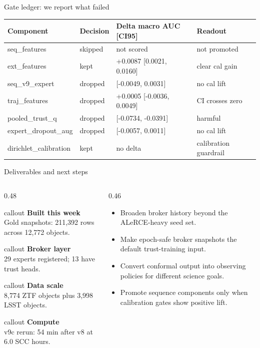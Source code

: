 \documentclass[aspectratio=169]{beamer}
\newcommand{\calloutbox}[2]{%
  \begin{beamercolorbox}[wd=\linewidth,sep=0.7em,rounded=true,shadow=false]{callout}
    {\bfseries\color{navy}#1}\\[-0.1em]
    {\footnotesize\color{slate}#2}
  \end{beamercolorbox}
}
\begin{document}
\begin{frame}{Gate ledger: we report what failed}
  \scriptsize
  \setlength{\tabcolsep}{3pt}
  \renewcommand{\arraystretch}{1.12}
  \begin{tabular}{>{\raggedright\arraybackslash}p{}
                  >{\raggedright\arraybackslash}p{}
                  >{\raggedright\arraybackslash}p{}
                  >{\raggedright\arraybackslash}p{}}
    \toprule
    Component & Decision & Delta macro AUC [CI95] & Readout \\
    \midrule
    seq\_features & skipped & not scored & not promoted \\
    ext\_features & kept & +0.0087 [0.0021, 0.0160] & clear cal gain \\
    seq\_v9\_expert & dropped & -0.0009 [-0.0049, 0.0031] & no cal lift \\
    traj\_features & dropped & +0.0005 [-0.0036, 0.0049] & CI crosses zero \\
    pooled\_trust\_q & dropped & -0.0569 [-0.0734, -0.0391] & harmful \\
    expert\_dropout\_aug & dropped & -0.0025 [-0.0057, 0.0011] & no cal lift \\
    dirichlet\_calibration & kept & no delta & calibration guardrail \\
    \bottomrule
  \end{tabular}
\end{frame}

\begin{frame}{Deliverables and next steps}
  \small
  \begin{columns}[T,totalwidth=\textwidth]
    \begin{column}{0.48\textwidth}
      \calloutbox{Built this week}{Gold snapshots: 211,392 rows across 12,772 objects.}
      \vspace{0.35em}
      \calloutbox{Broker layer}{29 experts registered; 13 have trust heads.}
      \vspace{0.35em}
      \calloutbox{Data scale}{8,774 ZTF objects plus 3,998 LSST objects.}
      \vspace{0.35em}
      \calloutbox{Compute}{v9c rerun: 54 min after v8 at 6.0 SCC hours.}
    \end{column}
    \begin{column}{0.46\textwidth}
      \begin{itemize}
        \item Broaden broker history beyond the ALeRCE-heavy seed set.
        \item Make epoch-safe broker snapshots the default trust-training input.
        \item Convert conformal output into observing policies for different science goals.
        \item Promote sequence components only when calibration gates show positive lift.
      \end{itemize}
    \end{column}
  \end{columns}
\end{frame}
\end{document}
